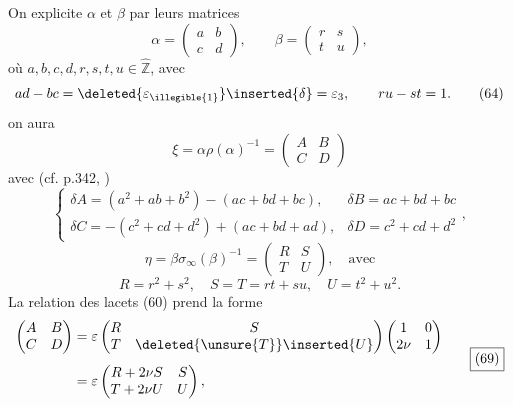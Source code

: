 On explicite $\alpha$ et $\beta$ par leurs matrices
\[
\alpha=\begin{pmatrix}a&b\\c&d\end{pmatrix},\qquad
\beta=\begin{pmatrix}r&s\\t&u\end{pmatrix},
\tag{63}
\]
où $a,b,c,d,r,s,t,u\in\widehat{\mathbb Z}$, avec
\[
ad-bc=\deleted{\varepsilon_{\illegible{1}}}\inserted{\delta}=\varepsilon_3,\qquad ru-st=1.
\tag{64}
\]
on aura
\[
\xi=\alpha\rho(\alpha)^{-1}=\begin{pmatrix}A&B\\C&D\end{pmatrix}
\tag{65}
\]
avec (cf. p.342, )
\[
\left\{\begin{array}{ll}
\delta A=(a^2+ab+b^2)-(ac+bd+bc),&\delta B=ac+bd+bc\\[4pt]
\delta C=-(c^2+cd+d^2)+(ac+bd+ad),&\delta D=c^2+cd+d^2
\end{array}\right.,
\tag{66}
\]
\[
\eta=\beta\sigma_\infty(\beta)^{-1}=\begin{pmatrix}R&S\\T&U\end{pmatrix},\quad\text{avec}
\tag{67}
\]
\[
R=r^2+s^2,\quad S=T=rt+su,\quad U=t^2+u^2.
\tag{68}
\]
La relation des lacets (60) prend la forme
\[
\begin{aligned}
\begin{pmatrix}A&B\\C&D\end{pmatrix}
&=\varepsilon\begin{pmatrix}R&S\\T&\deleted{\unsure{T}}\inserted{U}\end{pmatrix}
\begin{pmatrix}1&0\\2\nu&1\end{pmatrix}\\[4pt]
&=\varepsilon\begin{pmatrix}R+2\nu S&S\\T+2\nu U&U\end{pmatrix},
\end{aligned}
\tag*{\boxed{(69)}}
\]


